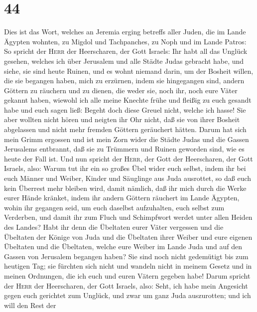 \hypertarget{section-43}{%
\section{44}\label{section-43}}

 Dies ist das Wort, welches an Jeremia erging betreffs
aller Juden, die im Lande Ägypten wohnten, zu Migdol und Tachpanches, zu
Noph und im Lande Patros:  So spricht der \textsc{Herr}
der Heerscharen, der Gott Israels: Ihr habt all das Unglück gesehen,
welches ich über Jerusalem und alle Städte Judas gebracht habe, und
siehe, sie sind heute Ruinen, und es wohnt niemand darin, 
um der Bosheit willen, die sie begangen haben, mich zu erzürnen, indem
sie hingegangen sind, andern Göttern zu räuchern und zu dienen, die
weder sie, noch ihr, noch eure Väter gekannt haben, 
wiewohl ich alle meine Knechte frühe und fleißig zu euch gesandt habe
und euch sagen ließ: Begeht doch diese Greuel nicht, welche ich hasse!
 Sie aber wollten nicht hören und neigten ihr Ohr nicht,
daß sie von ihrer Bosheit abgelassen und nicht mehr fremden Göttern
geräuchert hätten.  Darum hat sich mein Grimm ergossen und
ist mein Zorn wider die Städte Judas und die Gassen Jerusalems
entbrannt, daß sie zu Trümmern und Ruinen geworden sind, wie es heute
der Fall ist.  Und nun spricht der \textsc{Herr}, der Gott
der Heerscharen, der Gott Israels, also: Warum tut ihr ein so großes
Übel wider euch selbst, indem ihr bei euch Männer und Weiber, Kinder und
Säuglinge aus Juda ausrottet, so daß euch kein Überrest mehr bleiben
wird,  damit nämlich, daß ihr mich durch die Werke eurer
Hände kränket, indem ihr andern Göttern räuchert im Lande Ägypten, wohin
ihr gegangen seid, um euch daselbst aufzuhalten, euch selbst zum
Verderben, und damit ihr zum Fluch und Schimpfwort werdet unter allen
Heiden des Landes?  Habt ihr denn die Übeltaten eurer
Väter vergessen und die Übeltaten der Könige von Juda und die Übeltaten
ihrer Weiber und eure eigenen Übeltaten und die Übeltaten, welche eure
Weiber im Lande Juda und auf den Gassen von Jerusalem begangen haben?
 Sie sind noch nicht gedemütigt bis zum heutigen Tag; sie
fürchten sich nicht und wandeln nicht in meinem Gesetz und in meinen
Ordnungen, die ich euch und euren Vätern gegeben habe! 
Darum spricht der \textsc{Herr} der Heerscharen, der Gott Israels, also:
Seht, ich habe mein Angesicht gegen euch gerichtet zum Unglück, und zwar
um ganz Juda auszurotten;  und ich will den Rest der
